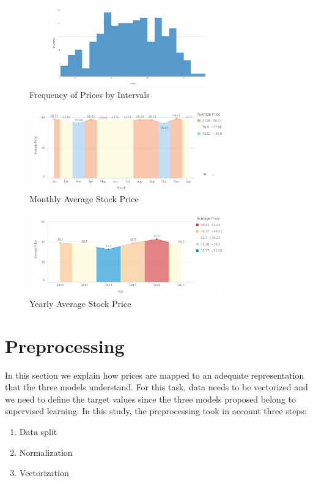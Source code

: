 \begin{figure}
\label{fig:walmexFreq}
\center
\includegraphics[width=8.5cm,height=3.5cm]{Figures/walmexHistogram.PNG}
\caption{Frequency of Prices by Intervals}
\end{figure}

\begin{figure}
\label{fig:walmexMonth}
\center
\includegraphics[width=8.5cm,height=3.5cm]{Figures/walmexMonth.PNG}
\caption{Monthly Average Stock Price}
\end{figure}

\begin{figure}
\label{fig:walmexYear}
\center
\includegraphics[width=8.5cm,height=3.5cm]{Figures/walmexYear.PNG}
\caption{Yearly Average Stock Price}
\end{figure}
\section{Preprocessing}

In this section we explain how prices are mapped to an adequate representation that the three models understand. For this task, data needs to be vectorized and we need to define the target values since the three models proposed belong to supervised learning. In this study, the preprocessing took in account three steps:

\begin{enumerate}
\item Data split
\item Normalization
\item Vectorization
\end{enumerate}

